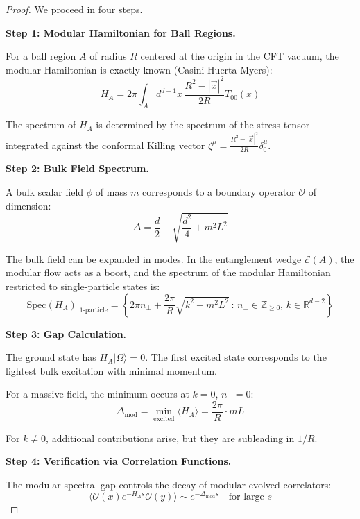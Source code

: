 \documentclass[12pt,a4paper]{article}
\begin{document}
\begin{proof}
We proceed in four steps.

\textbf{Step 1: Modular Hamiltonian for Ball Regions.}

For a ball region $A$ of radius $R$ centered at the origin in the CFT vacuum, the modular Hamiltonian is exactly known (Casini-Huerta-Myers):
\begin{equation}
H_A = 2\pi \int_A d^{d-1}x \, \frac{R^2 - |\vec{x}|^2}{2R} T_{00}(x)
\end{equation}

The spectrum of $H_A$ is determined by the spectrum of the stress tensor integrated against the conformal Killing vector $\zeta^\mu = \frac{R^2 - |\vec{x}|^2}{2R}\delta^\mu_0$.

\textbf{Step 2: Bulk Field Spectrum.}

A bulk scalar field $\phi$ of mass $m$ corresponds to a boundary operator $\mathcal{O}$ of dimension:
\begin{equation}
\Delta = \frac{d}{2} + \sqrt{\frac{d^2}{4} + m^2 L^2}
\end{equation}

The bulk field can be expanded in modes. In the entanglement wedge $\mathcal{E}(A)$, the modular flow acts as a boost, and the spectrum of the modular Hamiltonian restricted to single-particle states is:
\begin{equation}
\text{Spec}(H_A)|_{\text{1-particle}} = \left\{ 2\pi n_\perp + \frac{2\pi}{R}\sqrt{k^2 + m^2 L^2} \, : \, n_\perp \in \mathbb{Z}_{\geq 0}, \, k \in \mathbb{R}^{d-2} \right\}
\end{equation}

\textbf{Step 3: Gap Calculation.}

The ground state has $H_A |\Omega\rangle = 0$. The first excited state corresponds to the lightest bulk excitation with minimal momentum.

For a massive field, the minimum occurs at $k = 0$, $n_\perp = 0$:
\begin{equation}
\Delta_{\text{mod}} = \min_{\text{excited}} \langle H_A \rangle = \frac{2\pi}{R} \cdot mL
\end{equation}

For $k \neq 0$, additional contributions arise, but they are subleading in $1/R$.

\textbf{Step 4: Verification via Correlation Functions.}

The modular spectral gap controls the decay of modular-evolved correlators:
\begin{equation}
\langle \mathcal{O}(x) e^{-H_A s} \mathcal{O}(y) \rangle \sim e^{-\Delta_{\text{mod}} s} \quad \text{for large } s
\end{equation}


\end{proof}
\end{document}
